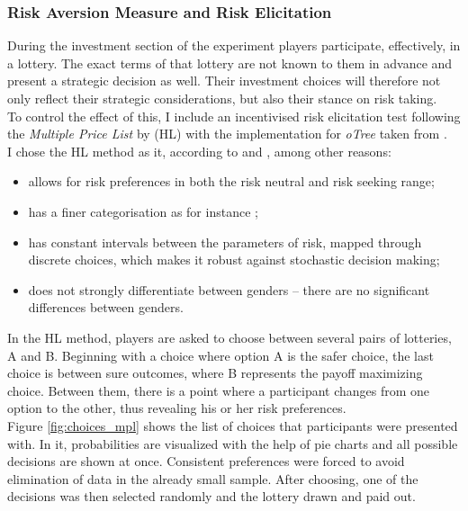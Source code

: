         
    \subsubsection{Risk Aversion Measure and Risk Elicitation}
    
    During the investment section of the experiment players participate, effectively, in a lottery. The exact terms of that lottery are not known to them in advance and present a strategic decision as well. Their investment choices will therefore not only reflect their strategic considerations, but also their stance on risk taking.\\
    
    To control the effect of this, I include an incentivised risk elicitation test following the \textit{Multiple Price List} by \cite{holt2002} (HL) with the implementation for \textit{oTree} taken from \cite{holzmeister2017}.\\
    
    I chose the HL method as it, according to \cite{crosetto2016} and \cite{harrison2008}, among other reasons:
    \begin{itemize}
        \item allows for risk preferences in both the risk neutral and risk seeking range;
        \item has a finer categorisation as for instance \cite{eckel2008};
        \item has constant intervals between the parameters of risk, mapped through discrete choices, which makes it robust against stochastic decision making;
        \item does not strongly differentiate between genders -- there are no significant differences between genders.
    \end{itemize}  
       
     In the HL method, players are asked to choose between several pairs of lotteries, A and B. Beginning with a choice where option A is the safer choice, the last choice is between sure outcomes, where B represents the payoff maximizing choice. Between them, there is a point where a participant changes from one option to the other, thus revealing his or her risk preferences.\\
     
     Figure \ref{fig:choices_mpl} shows the list of choices that participants were presented with. In it, probabilities are visualized with the help of pie charts and all possible decisions are shown at once. Consistent preferences were forced to avoid elimination of data in the already small sample. After choosing, one of the decisions was then selected randomly and the lottery drawn and paid out.\\
     
